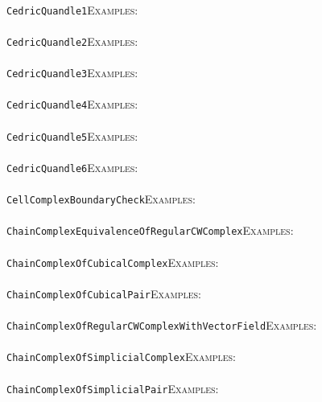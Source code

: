 \documentclass[a4paper,11pt]{report}
\begin{document}
{{ \\
 \texttt{Cedric{\textunderscore}Quandle1}{\nobreakspace}{\nobreakspace}{\nobreakspace}{\nobreakspace}\textsc{Examples:} \\
 \\
 \texttt{Cedric{\textunderscore}Quandle2}{\nobreakspace}{\nobreakspace}{\nobreakspace}{\nobreakspace}\textsc{Examples:} \\
 \\
 \texttt{Cedric{\textunderscore}Quandle3}{\nobreakspace}{\nobreakspace}{\nobreakspace}{\nobreakspace}\textsc{Examples:} \\
 \\
 \texttt{Cedric{\textunderscore}Quandle4}{\nobreakspace}{\nobreakspace}{\nobreakspace}{\nobreakspace}\textsc{Examples:} \\
 \\
 \texttt{Cedric{\textunderscore}Quandle5}{\nobreakspace}{\nobreakspace}{\nobreakspace}{\nobreakspace}\textsc{Examples:} \\
 \\
 \texttt{Cedric{\textunderscore}Quandle6}{\nobreakspace}{\nobreakspace}{\nobreakspace}{\nobreakspace}\textsc{Examples:} \\
 \\
 \texttt{CellComplexBoundaryCheck}{\nobreakspace}{\nobreakspace}{\nobreakspace}{\nobreakspace}\textsc{Examples:} \\
 \\
 \texttt{ChainComplexEquivalenceOfRegularCWComplex}{\nobreakspace}{\nobreakspace}{\nobreakspace}{\nobreakspace}\textsc{Examples:} \\
 \\
 \texttt{ChainComplexOfCubicalComplex}{\nobreakspace}{\nobreakspace}{\nobreakspace}{\nobreakspace}\textsc{Examples:} \\
 \\
 \texttt{ChainComplexOfCubicalPair}{\nobreakspace}{\nobreakspace}{\nobreakspace}{\nobreakspace}\textsc{Examples:} \\
 \\
 \texttt{ChainComplexOfRegularCWComplexWithVectorField}{\nobreakspace}{\nobreakspace}{\nobreakspace}{\nobreakspace}\textsc{Examples:} \\
 \\
 \texttt{ChainComplexOfSimplicialComplex}{\nobreakspace}{\nobreakspace}{\nobreakspace}{\nobreakspace}\textsc{Examples:} \\
 \\
 \texttt{ChainComplexOfSimplicialPair}{\nobreakspace}{\nobreakspace}{\nobreakspace}{\nobreakspace}\textsc{Examples:} \\
}}
\end{document}
